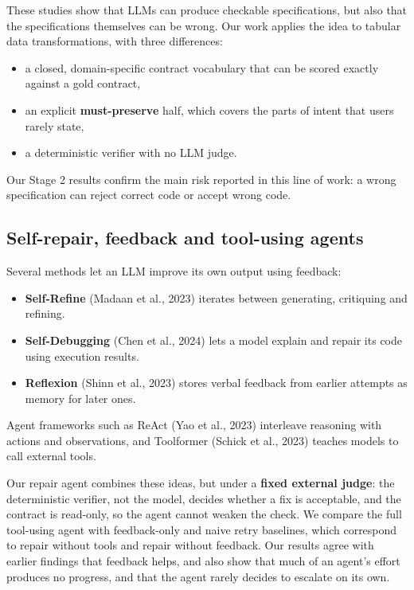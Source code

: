 \documentclass[11pt]{article}
\providecommand{\tightlist}{\setlength{\itemsep}{0pt}\setlength{\parskip}{0pt}}
\begin{document}
These studies show that LLMs can produce checkable specifications, but
also that the specifications themselves can be wrong. Our work applies
the idea to tabular data transformations, with three differences:

\begin{itemize}
\tightlist
\item
  a closed, domain-specific contract vocabulary that can be scored
  exactly against a gold contract,
\item
  an explicit \textbf{must-preserve} half, which covers the parts of
  intent that users rarely state,
\item
  a deterministic verifier with no LLM judge.
\end{itemize}

Our Stage 2 results confirm the main risk reported in this line of work:
a wrong specification can reject correct code or accept wrong code.

\subsection{Self-repair, feedback and tool-using agents}

Several methods let an LLM improve its own output using feedback:

\begin{itemize}
\tightlist
\item
  \textbf{Self-Refine} (Madaan et al., 2023) iterates between
  generating, critiquing and refining.
\item
  \textbf{Self-Debugging} (Chen et al., 2024) lets a model explain and
  repair its code using execution results.
\item
  \textbf{Reflexion} (Shinn et al., 2023) stores verbal feedback from
  earlier attempts as memory for later ones.
\end{itemize}

Agent frameworks such as ReAct (Yao et al., 2023) interleave reasoning
with actions and observations, and Toolformer (Schick et al., 2023)
teaches models to call external tools.

Our repair agent combines these ideas, but under a \textbf{fixed
external judge}: the deterministic verifier, not the model, decides
whether a fix is acceptable, and the contract is read-only, so the agent
cannot weaken the check. We compare the full tool-using agent with
feedback-only and naive retry baselines, which correspond to repair
without tools and repair without feedback. Our results agree with
earlier findings that feedback helps, and also show that much of an
agent's effort produces no progress, and that the agent rarely decides
to escalate on its own.
\end{document}
